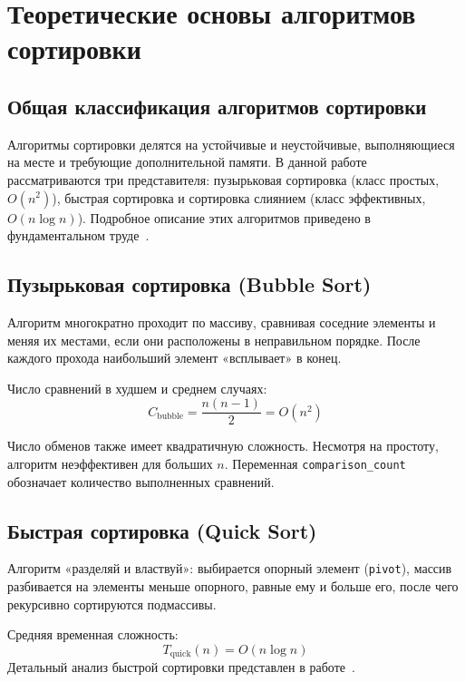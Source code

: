 \section{Теоретические основы алгоритмов сортировки}

\subsection{Общая классификация алгоритмов сортировки}

Алгоритмы сортировки делятся на устойчивые и неустойчивые, выполняющиеся на месте и требующие дополнительной памяти. В данной работе рассматриваются три представителя: пузырьковая сортировка (класс простых, $O(n^2)$), быстрая сортировка и сортировка слиянием (класс эффективных, $O(n \log n)$). Подробное описание этих алгоритмов приведено в фундаментальном труде~\cite{knuth1998}.

\subsection{Пузырьковая сортировка (Bubble Sort)}

Алгоритм многократно проходит по массиву, сравнивая соседние элементы и меняя их местами, если они расположены в неправильном порядке. После каждого прохода наибольший элемент «всплывает» в конец.

Число сравнений в худшем и среднем случаях:
\begin{equation}
    \label{eq:bubble_comp}
    C_{\text{bubble}} = \frac{n(n-1)}{2} = O(n^2)
\end{equation}

Число обменов также имеет квадратичную сложность. Несмотря на простоту, алгоритм неэффективен для больших $n$. Переменная \texttt{comparison\_count} обозначает количество выполненных сравнений.

\subsection{Быстрая сортировка (Quick Sort)}

Алгоритм «разделяй и властвуй»: выбирается опорный элемент (\texttt{pivot}), массив разбивается на элементы меньше опорного, равные ему и больше его, после чего рекурсивно сортируются подмассивы.

Средняя временная сложность:
\begin{equation}
    \label{eq:quick}
    T_{\text{quick}}(n) = O(n \log n)
\end{equation}
Детальный анализ быстрой сортировки представлен в работе~\cite{cormen2009}.

